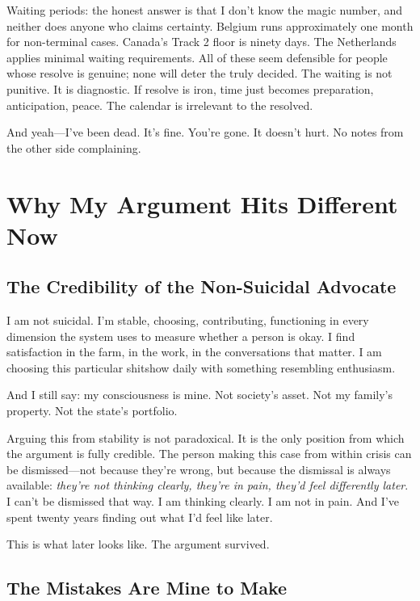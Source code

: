 \documentclass[10pt, letterpaper, twocolumn]{article}
\begin{document}
Waiting periods: the honest answer is that I don't know the magic number, and neither does anyone who claims certainty. Belgium runs approximately one month for non-terminal cases. Canada's Track 2 floor is ninety days. The Netherlands applies minimal waiting requirements. All of these seem defensible for people whose resolve is genuine; none will deter the truly decided. The waiting is not punitive. It is diagnostic. If resolve is iron, time just becomes preparation, anticipation, peace. The calendar is irrelevant to the resolved.

And yeah---I've been dead. It's fine. You're gone. It doesn't hurt. No notes from the other side complaining.

\section{Why My Argument Hits Different Now}

\subsection{The Credibility of the Non-Suicidal Advocate}

I am not suicidal. I'm stable, choosing, contributing, functioning in every dimension the system uses to measure whether a person is okay. I find satisfaction in the farm, in the work, in the conversations that matter. I am choosing this particular shitshow daily with something resembling enthusiasm.

And I still say: my consciousness is mine. Not society's asset. Not my family's property. Not the state's portfolio.

Arguing this from stability is not paradoxical. It is the only position from which the argument is fully credible. The person making this case from within crisis can be dismissed---not because they're wrong, but because the dismissal is always available: \textit{they're not thinking clearly, they're in pain, they'd feel differently later}. I can't be dismissed that way. I am thinking clearly. I am not in pain. And I've spent twenty years finding out what I'd feel like later.

This is what later looks like. The argument survived.

\subsection{The Mistakes Are Mine to Make}
\end{document}
